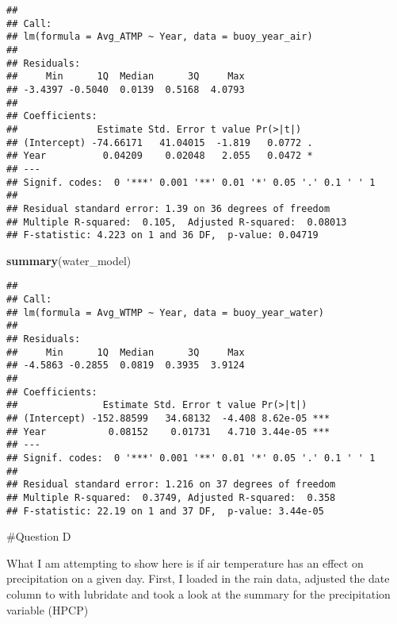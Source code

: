 \documentclass[
]{article}
\newenvironment{Shaded}{\begin{snugshade}}{\end{snugshade}}
\newcommand{\FunctionTok}[1]{\textcolor[rgb]{0.13,0.29,0.53}{\textbf{#1}}}
\newcommand{\NormalTok}[1]{#1}
\newcommand{\OtherTok}[1]{\textcolor[rgb]{0.56,0.35,0.01}{#1}}
\newcommand{\SpecialCharTok}[1]{\textcolor[rgb]{0.81,0.36,0.00}{\textbf{#1}}}
\newcommand{\StringTok}[1]{\textcolor[rgb]{0.31,0.60,0.02}{#1}}
\begin{document}
\begin{verbatim}
## 
## Call:
## lm(formula = Avg_ATMP ~ Year, data = buoy_year_air)
## 
## Residuals:
##     Min      1Q  Median      3Q     Max 
## -3.4397 -0.5040  0.0139  0.5168  4.0793 
## 
## Coefficients:
##              Estimate Std. Error t value Pr(>|t|)  
## (Intercept) -74.66171   41.04015  -1.819   0.0772 .
## Year          0.04209    0.02048   2.055   0.0472 *
## ---
## Signif. codes:  0 '***' 0.001 '**' 0.01 '*' 0.05 '.' 0.1 ' ' 1
## 
## Residual standard error: 1.39 on 36 degrees of freedom
## Multiple R-squared:  0.105,  Adjusted R-squared:  0.08013 
## F-statistic: 4.223 on 1 and 36 DF,  p-value: 0.04719
\end{verbatim}

\begin{Shaded}
\begin{Highlighting}[]
\FunctionTok{summary}\NormalTok{(water\_model)}
\end{Highlighting}
\end{Shaded}

\begin{verbatim}
## 
## Call:
## lm(formula = Avg_WTMP ~ Year, data = buoy_year_water)
## 
## Residuals:
##     Min      1Q  Median      3Q     Max 
## -4.5863 -0.2855  0.0819  0.3935  3.9124 
## 
## Coefficients:
##               Estimate Std. Error t value Pr(>|t|)    
## (Intercept) -152.88599   34.68132  -4.408 8.62e-05 ***
## Year           0.08152    0.01731   4.710 3.44e-05 ***
## ---
## Signif. codes:  0 '***' 0.001 '**' 0.01 '*' 0.05 '.' 0.1 ' ' 1
## 
## Residual standard error: 1.216 on 37 degrees of freedom
## Multiple R-squared:  0.3749, Adjusted R-squared:  0.358 
## F-statistic: 22.19 on 1 and 37 DF,  p-value: 3.44e-05
\end{verbatim}

\#Question D

What I am attempting to show here is if air temperature has an effect on
precipitation on a given day. First, I loaded in the rain data, adjusted
the date column to with lubridate and took a look at the summary for the
precipitation variable (HPCP)

\begin{Shaded}
\end{Shaded}
\end{document}
